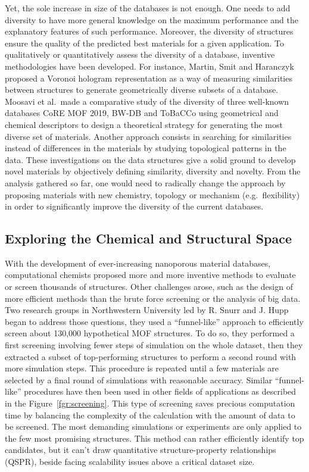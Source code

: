 \documentclass[main.tex]{subfiles}
\begin{document}
Yet, the sole increase in size of the databases is not enough. One needs to add diversity to have more general knowledge on the maximum performance and the explanatory features of such performance. Moreover, the diversity of structures ensure the quality of the predicted best materials for a given application. To qualitatively or quantitatively assess the diversity of a database, inventive methodologies have been developed. For instance, Martin, Smit and Haranczyk proposed a Voronoi hologram representation as a way of measuring similarities between structures to generate geometrically diverse subsets of a database.\cite{Martin_2011} Moosavi et al.\ made a comparative study of the diversity of three well-known databases CoRE MOF 2019,\cite{Chung_2019} BW-DB\cite{Boyd_2016} and ToBaCCo\cite{Gomez_Gualdron_2016, Colon_2017}  using geometrical and chemical descriptors to design a theoretical strategy for generating the most diverse set of materials.\cite{Moosavi_2020} Another approach consists in searching for similarities instead of differences in the materials by studying topological patterns in the data.\cite{Lee_2017} These investigations on the data structures give a solid ground to develop novel materials by objectively defining similarity, diversity and novelty. From the analysis gathered so far, one would need to radically change the approach by proposing materials with new chemistry, topology or mechanism (e.g.\ flexibility) in order to significantly improve the diversity of the current databases.


\subsection{Exploring the Chemical and Structural Space}


With the development of ever-increasing nanoporous material databases, computational chemists proposed more and more inventive methods to evaluate or screen thousands of structures. Other challenges arose, such as the design of more efficient methods than the brute force screening or the analysis of big data. Two research groups in Northwestern University led by R. Snurr and J. Hupp began to address those questions, they used a ``funnel-like'' approach to efficiently screen about 130,000 hypothetical MOF structures.\cite{Wilmer_2012} To do so, they performed a first screening involving fewer steps of simulation on the whole dataset, then they extracted a subset of top-performing structures to perform a second round with more simulation steps. This procedure is repeated until a few materials are selected by a final round of simulations with reasonable accuracy. Similar ``funnel-like'' procedures have then been used in other fields of applications as described in the Figure~\ref{fgr:screening}. This type of screening saves precious computation time by balancing the complexity of the calculation with the amount of data to be screened. The most demanding simulations or experiments are only applied to the few most promising structures. This method can rather efficiently identify top candidates, but it can't draw quantitative structure-property relationships (QSPR), beside facing scalability issues above a critical dataset size.
\end{document}
